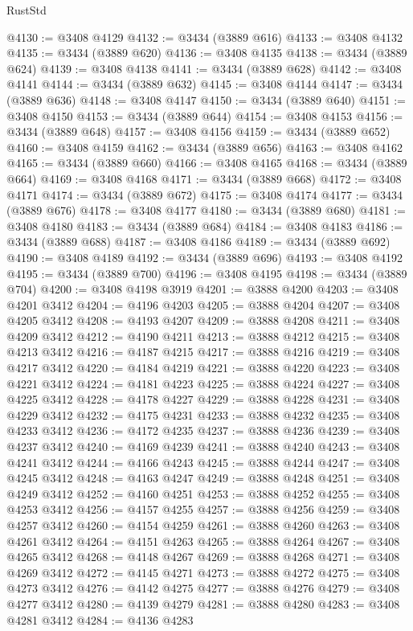 \begin{lexlean}{RustStd}
\begin{coremodule}
@4130 := @3408 @4129
@4132 := @3434 (@3889 @616)
@4133 := @3408 @4132
@4135 := @3434 (@3889 @620)
@4136 := @3408 @4135
@4138 := @3434 (@3889 @624)
@4139 := @3408 @4138
@4141 := @3434 (@3889 @628)
@4142 := @3408 @4141
@4144 := @3434 (@3889 @632)
@4145 := @3408 @4144
@4147 := @3434 (@3889 @636)
@4148 := @3408 @4147
@4150 := @3434 (@3889 @640)
@4151 := @3408 @4150
@4153 := @3434 (@3889 @644)
@4154 := @3408 @4153
@4156 := @3434 (@3889 @648)
@4157 := @3408 @4156
@4159 := @3434 (@3889 @652)
@4160 := @3408 @4159
@4162 := @3434 (@3889 @656)
@4163 := @3408 @4162
@4165 := @3434 (@3889 @660)
@4166 := @3408 @4165
@4168 := @3434 (@3889 @664)
@4169 := @3408 @4168
@4171 := @3434 (@3889 @668)
@4172 := @3408 @4171
@4174 := @3434 (@3889 @672)
@4175 := @3408 @4174
@4177 := @3434 (@3889 @676)
@4178 := @3408 @4177
@4180 := @3434 (@3889 @680)
@4181 := @3408 @4180
@4183 := @3434 (@3889 @684)
@4184 := @3408 @4183
@4186 := @3434 (@3889 @688)
@4187 := @3408 @4186
@4189 := @3434 (@3889 @692)
@4190 := @3408 @4189
@4192 := @3434 (@3889 @696)
@4193 := @3408 @4192
@4195 := @3434 (@3889 @700)
@4196 := @3408 @4195
@4198 := @3434 (@3889 @704)
@4200 := @3408 @4198 @3919
@4201 := @3888 @4200
@4203 := @3408 @4201 @3412
@4204 := @4196 @4203
@4205 := @3888 @4204
@4207 := @3408 @4205 @3412
@4208 := @4193 @4207
@4209 := @3888 @4208
@4211 := @3408 @4209 @3412
@4212 := @4190 @4211
@4213 := @3888 @4212
@4215 := @3408 @4213 @3412
@4216 := @4187 @4215
@4217 := @3888 @4216
@4219 := @3408 @4217 @3412
@4220 := @4184 @4219
@4221 := @3888 @4220
@4223 := @3408 @4221 @3412
@4224 := @4181 @4223
@4225 := @3888 @4224
@4227 := @3408 @4225 @3412
@4228 := @4178 @4227
@4229 := @3888 @4228
@4231 := @3408 @4229 @3412
@4232 := @4175 @4231
@4233 := @3888 @4232
@4235 := @3408 @4233 @3412
@4236 := @4172 @4235
@4237 := @3888 @4236
@4239 := @3408 @4237 @3412
@4240 := @4169 @4239
@4241 := @3888 @4240
@4243 := @3408 @4241 @3412
@4244 := @4166 @4243
@4245 := @3888 @4244
@4247 := @3408 @4245 @3412
@4248 := @4163 @4247
@4249 := @3888 @4248
@4251 := @3408 @4249 @3412
@4252 := @4160 @4251
@4253 := @3888 @4252
@4255 := @3408 @4253 @3412
@4256 := @4157 @4255
@4257 := @3888 @4256
@4259 := @3408 @4257 @3412
@4260 := @4154 @4259
@4261 := @3888 @4260
@4263 := @3408 @4261 @3412
@4264 := @4151 @4263
@4265 := @3888 @4264
@4267 := @3408 @4265 @3412
@4268 := @4148 @4267
@4269 := @3888 @4268
@4271 := @3408 @4269 @3412
@4272 := @4145 @4271
@4273 := @3888 @4272
@4275 := @3408 @4273 @3412
@4276 := @4142 @4275
@4277 := @3888 @4276
@4279 := @3408 @4277 @3412
@4280 := @4139 @4279
@4281 := @3888 @4280
@4283 := @3408 @4281 @3412
@4284 := @4136 @4283

\end{coremodule}
\end{lexlean}
